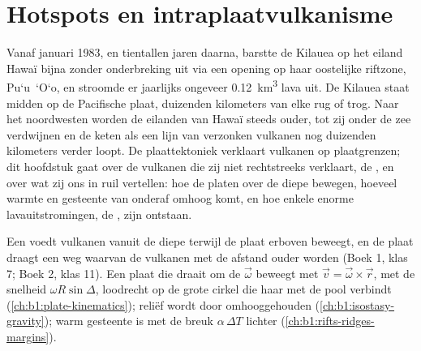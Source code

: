 \chapter{Hotspots en intraplaatvulkanisme}\label{ch:b1:hotspots}

Vanaf januari 1983, en tientallen jaren daarna, barstte de Kilauea op het eiland Hawaï bijna zonder onderbreking uit via een opening op haar oostelijke riftzone, Pu\textquoteleft u~\textquoteleft O\textquoteleft o, en stroomde er jaarlijks ongeveer \qty{0.12}{km^3} lava uit. De Kilauea staat midden op de Pacifische plaat, duizenden kilometers van elke rug of trog. Naar het noordwesten worden de eilanden van Hawaï steeds ouder, tot zij onder de zee verdwijnen en de keten als een lijn van verzonken vulkanen nog duizenden kilometers verder loopt. De plaattektoniek verklaart vulkanen op plaatgrenzen; dit hoofdstuk gaat over de vulkanen die zij niet rechtstreeks verklaart, de , en over wat zij ons in ruil vertellen: hoe de platen over de diepe  bewegen, hoeveel warmte en gesteente van onderaf omhoog komt, en hoe enkele enorme lavauitstromingen, de , zijn ontstaan.

\begin{recall}
Een  voedt vulkanen vanuit de diepe  terwijl de plaat erboven beweegt, en de plaat draagt een  weg waarvan de vulkanen met de afstand ouder worden (Boek 1, klas 7; Boek 2, klas 11). Een plaat die draait om de  $\vec\omega$ beweegt met $\vec v = \vec\omega\times\vec r$, met de snelheid $\omega R\sin\Delta$, loodrecht op de grote cirkel die haar met de pool verbindt (\cref{ch:b1:plate-kinematics}); reliëf wordt door  omhooggehouden (\cref{ch:b1:isostasy-gravity}); warm gesteente is met de breuk $\alpha\,\Delta T$ lichter (\cref{ch:b1:rifts-ridges-margins}).
\end{recall}

